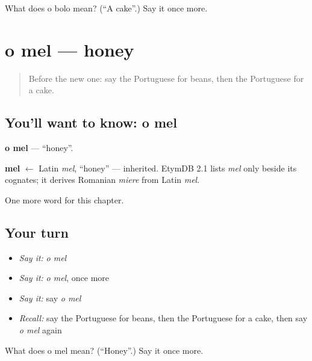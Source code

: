 \begin{tcolorbox}[breakable,colback=teal!4,colframe=teal!35!black,title={Before you move on}]
What does o bolo mean? (\textquotedblleft{}A cake\textquotedblright{}.) Say it once more.
\end{tcolorbox}
\section[o mel]{o mel — honey}

\label{lesson:PT-C47-mel}



\begin{quote}
Before the new one: say the Portuguese for beans, then the Portuguese for a cake.
\end{quote}

\subsection*{You'll want to know: o mel}
\textbf{o mel} — \textquotedblleft{}honey\textquotedblright{}.

\begin{cousinweb}
\textbf{mel} $\leftarrow$ Latin \emph{mel}, \textquotedblleft{}honey\textquotedblright{} — inherited. EtymDB 2.1 lists \emph{mel} only beside its cognates; it derives Romanian \emph{miere} from Latin \emph{mel}.
\end{cousinweb}

\begin{grammarlens}[title={What you've built}]
One more word for this chapter.
\end{grammarlens}

\subsection*{Your turn}
\begin{itemize}
\raggedright
  \item \emph{Say it:} \emph{o mel}
  \item \emph{Say it:} \emph{o mel}, once more
  \item \emph{Say it:} say \emph{o mel}
  \item \emph{Recall:} say the Portuguese for beans, then the Portuguese for a cake, then say \emph{o mel} again
\end{itemize}

\begin{tcolorbox}[breakable,colback=teal!4,colframe=teal!35!black,title={Before you move on}]
What does o mel mean? (\textquotedblleft{}Honey\textquotedblright{}.) Say it once more.
\end{tcolorbox}
